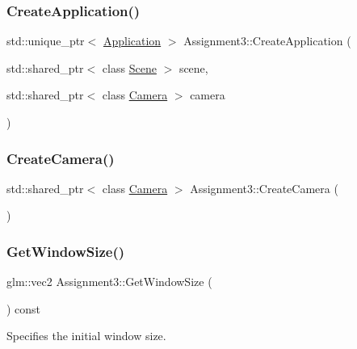 \subsubsection{\texorpdfstring{Create\+Application()}{CreateApplication()}}
{\footnotesize\ttfamily std\+::unique\+\_\+ptr$<$ \hyperlink{class_application}{Application} $>$ Assignment3\+::\+Create\+Application (\begin{DoxyParamCaption}\item[{std\+::shared\+\_\+ptr$<$ class \hyperlink{class_scene}{Scene} $>$}]{scene,  }\item[{std\+::shared\+\_\+ptr$<$ class \hyperlink{class_camera}{Camera} $>$}]{camera }\end{DoxyParamCaption})\hspace{0.3cm}{\ttfamily [static]}}

\hypertarget{class_assignment3_a47d1b58079eee3e135e08768cd2a2461}{}\label{class_assignment3_a47d1b58079eee3e135e08768cd2a2461}
\subsubsection{\texorpdfstring{Create\+Camera()}{CreateCamera()}}
{\footnotesize\ttfamily std\+::shared\+\_\+ptr$<$ class \hyperlink{class_camera}{Camera} $>$ Assignment3\+::\+Create\+Camera (\begin{DoxyParamCaption}{ }\end{DoxyParamCaption})\hspace{0.3cm}{\ttfamily [static]}}

\hypertarget{class_assignment3_aec48ba5500d906963fdac555ee47cb72}{}\label{class_assignment3_aec48ba5500d906963fdac555ee47cb72}
\subsubsection{\texorpdfstring{Get\+Window\+Size()}{GetWindowSize()}}
{\footnotesize\ttfamily glm\+::vec2 Assignment3\+::\+Get\+Window\+Size (\begin{DoxyParamCaption}{ }\end{DoxyParamCaption}) const\hspace{0.3cm}{\ttfamily [virtual]}}



Specifies the initial window size.

